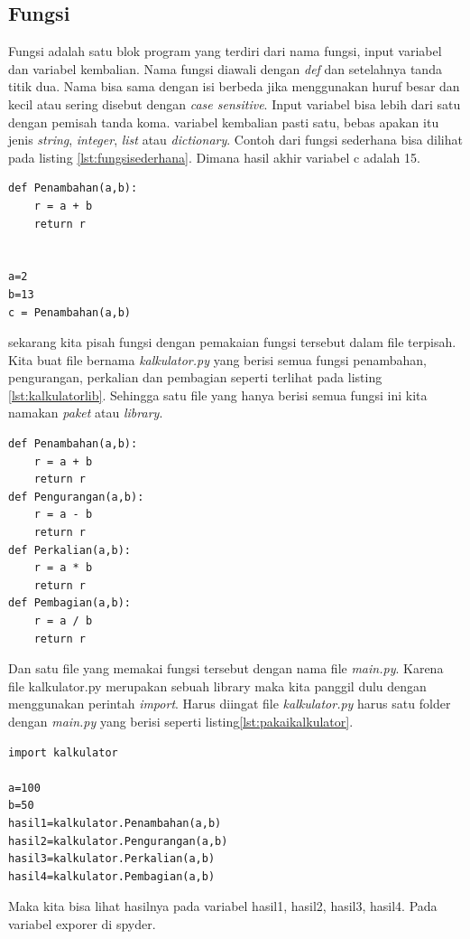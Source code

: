 \subsection{Fungsi}
Fungsi adalah satu blok program yang terdiri dari nama fungsi, input variabel dan variabel kembalian. Nama fungsi diawali dengan \textit{def} dan setelahnya tanda titik dua. Nama bisa sama dengan isi berbeda jika menggunakan huruf besar dan kecil atau sering disebut dengan \textit{case sensitive}. Input variabel bisa lebih dari satu dengan pemisah tanda koma. variabel kembalian pasti satu, bebas apakan itu jenis \textit{string}, \textit{integer}, \textit{list} atau \textit{dictionary}. Contoh dari fungsi sederhana bisa dilihat pada listing \ref{lst:fungsisederhana}. Dimana hasil akhir variabel c adalah 15.
\begin{lstlisting}[caption=Fungsi Sederhana,label={lst:fungsisederhana}]
def Penambahan(a,b):
	r = a + b
	return r
	
	
a=2
b=13
c = Penambahan(a,b)
\end{lstlisting}
sekarang kita pisah fungsi dengan pemakaian fungsi tersebut dalam file terpisah. Kita buat file bernama \textit{kalkulator.py} yang berisi semua fungsi penambahan, pengurangan, perkalian dan pembagian seperti terlihat pada listing \ref{lst:kalkulatorlib}. Sehingga satu file yang hanya berisi semua fungsi ini kita namakan \textit{paket} atau \textit{library}.
\begin{lstlisting}[caption=Library atau Paket kalkulator,label={lst:kalkulatorlib}]
def Penambahan(a,b):
	r = a + b
	return r
def Pengurangan(a,b):
	r = a - b
	return r
def Perkalian(a,b):
	r = a * b
	return r
def Pembagian(a,b):
	r = a / b
	return r
\end{lstlisting}
	Dan satu file yang memakai fungsi tersebut dengan nama file \textit{main.py}. Karena file kalkulator.py merupakan sebuah library maka kita panggil dulu dengan menggunakan perintah \textit{import}. Harus diingat file \textit{kalkulator.py} harus satu folder dengan \textit{main.py} yang berisi seperti listing\ref{lst:pakaikalkulator}.
\begin{lstlisting}[caption=Cara penggunaan library kalkulator,label={lst:pakaikalkulator}]
import kalkulator

a=100
b=50
hasil1=kalkulator.Penambahan(a,b)
hasil2=kalkulator.Pengurangan(a,b)
hasil3=kalkulator.Perkalian(a,b)
hasil4=kalkulator.Pembagian(a,b)
\end{lstlisting}
Maka kita bisa lihat hasilnya pada variabel hasil1, hasil2, hasil3, hasil4. Pada variabel exporer di spyder.


